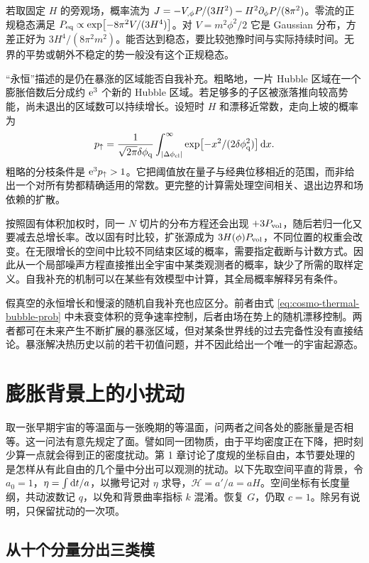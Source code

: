 若取固定 $H$ 的旁观场，概率流为 $J=-V_{,\phi}P/(3H^2)-H^2\partial_\phi P/(8\pi^2)$。零流的正规稳态满足 $P_{\rm eq}\propto\exp[-8\pi^2V/(3H^4)]$。对 $V=m^2\phi^2/2$ 它是 Gaussian 分布，方差正好为 $3H^4/(8\pi^2m^2)$。能否达到稳态，要比较弛豫时间与实际持续时间。无界的平势或朝外不稳定的势一般没有这个正规稳态。

“永恒”描述的是仍在暴涨的区域能否自我补充。粗略地，一片 Hubble 区域在一个膨胀倍数后分成约 $\mathrm{e}^3$ 个新的 Hubble 区域。若足够多的子区被涨落推向较高势能，尚未退出的区域数可以持续增长。设短时 $H$ 和漂移近常数，走向上坡的概率为
\[
 p_\uparrow
 =\frac1{\sqrt{2\pi}\delta\phi_{\rm q}}
   \int_{|\Delta\phi_{\rm cl}|}^{\infty}
   \exp[-x^2/(2\delta\phi_{\rm q}^2)]\,\dd x .
\]
粗略的分枝条件是 $\mathrm{e}^3p_\uparrow>1$。它把阈值放在量子与经典位移相近的范围，而非给出一个对所有势都精确适用的常数。更完整的计算需处理空间相关、退出边界和场依赖的扩散。

按照固有体积加权时，同一 $N$ 切片的分布方程还会出现 $+3P_{\rm vol}$，随后若归一化又要减去总增长率。改以固有时比较，扩张源成为 $3H(\phi)P_{\rm vol}$，不同位置的权重会改变。在无限增长的空间中比较不同结束区域的概率，需要指定截断与计数方式。因此从一个局部噪声方程直接推出全宇宙中某类观测者的概率，缺少了所需的取样定义。自我补充的机制可以在某些有效模型中计算，其全局概率解释另有条件。

假真空的永恒增长和慢滚的随机自我补充也应区分。前者由式 \eqref{eq:cosmo-thermal-bubble-prob} 中未衰变体积的竞争速率控制，后者由场在势上的随机漂移控制。两者都可在未来产生不断扩展的暴涨区域，但对某条世界线的过去完备性没有直接结论。暴涨解决热历史以前的若干初值问题，并不因此给出一个唯一的宇宙起源态。

\section{膨胀背景上的小扰动}\label{sec:cosmo-linear}

取一张早期宇宙的等温面与一张晚期的等温面，问两者之间各处的膨胀量是否相等。这一问法有意先规定了面。譬如同一团物质，由于平均密度正在下降，把时刻少算一点就会得到正的密度扰动。第 1 章讨论了度规的坐标自由，本节要处理的是怎样从有此自由的几个量中分出可以观测的扰动。以下先取空间平直的背景，令 $a_0=1$，$\eta=\int\dd t/a$，以撇号记对 $\eta$ 求导，$\mathcal H=a'/a=aH$。空间坐标有长度量纲，共动波数记 $q$，以免和背景曲率指标 $k$ 混淆。恢复 $G$，仍取 $c=1$。除另有说明，只保留扰动的一次项。

\subsection{从十个分量分出三类模}

